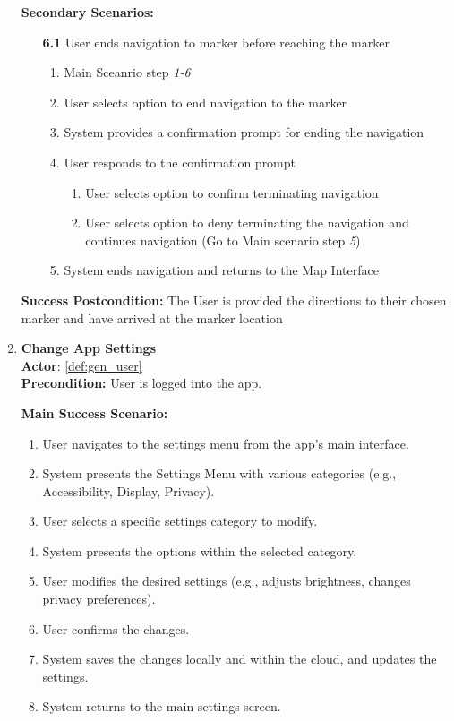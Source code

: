 \documentclass{article}
\begin{document}
\begin{enumerate}[label=\textbf{UC\arabic*}]
        \textbf{Secondary Scenarios:}
        \begin{itemize}
            \item[{\textbf{6.1}}] User ends navigation to marker before reaching the marker
            \begin{enumerate}[label=\textbf{\arabic*.}]
                \item Main Sceanrio step \textit{1-6}
                \item User selects option to end navigation to the marker
                \item System provides a confirmation prompt for ending the navigation
                \item User responds to the confirmation prompt
                \begin{enumerate}[label=(\alph*)]
                    \item User selects option to confirm terminating navigation
                    \item User selects option to deny terminating the navigation and continues navigation (Go to Main scenario step \textit{5})
                \end{enumerate}
                \item System ends navigation and returns to the Map Interface
            \end{enumerate}
        \end{itemize}
        \textbf{Success Postcondition:} The User is provided the directions to their chosen marker and have arrived at the marker location

    \item \label{uc:13} \textbf{Change App Settings} \\
        \textbf{Actor}: \ref{def:gen_user} \\
        \textbf{Precondition:} User is logged into the app.
    
        \textbf{Main Success Scenario:}
        \begin{enumerate}[label=\textbf{\arabic*.}]
            \item User navigates to the settings menu from the app’s main interface.
            \item System presents the Settings Menu with various categories (e.g., Accessibility, Display, Privacy).
            \item User selects a specific settings category to modify.
            \item System presents the options within the selected category.
            \item User modifies the desired settings (e.g., adjusts brightness, changes privacy preferences).
            \item User confirms the changes.
            \item System saves the changes locally and within the cloud, and updates the settings.
            \item System returns to the main settings screen.
        \end{enumerate}
        

\end{enumerate}
\end{document}
